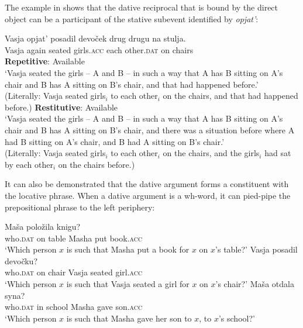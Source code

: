 \documentclass[output=paper]{langscibook}
\begin{document}
\noindent The example in  shows that the dative reciprocal that is bound by the direct object can be a participant of the stative subevent identified by \textit{opjat’}:


 \ea\label{ex:bondarenko:41}
\gll Vasja opjat’ posadil devoček drug drugu na stulja.\\
     Vasja again seated girls.\textsc{acc} each other.\textsc{dat} on chairs\\
\ea \textbf{Repetitive}: Available\\
‘Vasja seated the girls -- A and B -- in such a way that A has B sitting on A's chair and B has A sitting on B's chair, and that had happened before.’\\
(Literally: Vasja seated girls$_i$ to each other$_i$ on the chairs, and that had happened before.)
\ex \textbf{Restitutive}: Available\\
‘Vasja seated the girls -- A and B -- in such a way that A has B sitting on A's chair and B has A sitting on B's chair, and there was a situation before where A had B sitting on A's chair, and B had A sitting on B's chair.'\\
(Literally: Vasja seated girls$_i$ to each other$_i$ on the chairs, and the   girls$_i$ had sat by each other$_i$ on the chairs before.)\\
\z\z


\noindent It can also be demonstrated that the dative argument forms a constituent with the locative phrase. When a dative argument is a wh-word, it can pied-pipe the prepositional phrase to the left periphery:


 \ea\label{ex:bondarenko:42}
\ea{} Maša položila knigu?\\
     {} who.\textsc{dat} on table Masha put book.\textsc{acc}\\
\glt `Which person $x$ is such that Masha put a book for $x$ on $x$'s table?'
\ex\label{ex:bondarenko:43}
 Vasja posadil devočku?\\
     {} who.\textsc{dat} on chair Vasja seated girl.\textsc{acc}\\
\glt `Which person $x$ is such that Vasja seated a girl for $x$ on $x$'s chair?'
\ex\label{ex:bondarenko:44}
 Maša otdala syna?\\
     {} who.\textsc{dat} in school Masha gave son.\textsc{acc}\\
\glt `Which person $x$ is such that Masha gave her son to $x$, to $x$'s school?'
\z\z
\end{document}
